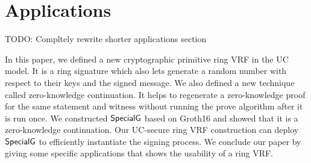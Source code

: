\vspace{-6mm}
\section{Applications}
\label{sec:applicaitons_short}

TODO: Compltely rewrite shorter applications section


In this paper,  we defined a new cryptographic primitive ring VRF in the UC model. It is a ring signature which also lets generate a random number with respect to their keys and the signed message. We  also defined a new technique called zero-knowledge continuation. It helps to regenerate a zero-knowledge proof for the same statement and witness without running the prove algorithm after it is run once. We constructed  $ {\mathsf{SpecialG}} $ based on Groth16 \cite{Groth16} and showed that it is a zero-knowledge continuation. Our UC-secure ring VRF construction can deploy $ {\mathsf{SpecialG}} $ to efficiently instantiate the signing process. 
We conclude our paper by giving some specific applications that shows the usability of a ring VRF.

